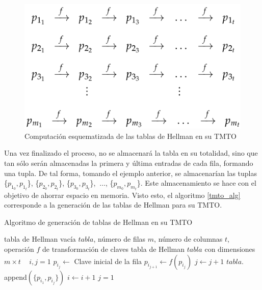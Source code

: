 \documentclass[12pt,spanish,listoffigures,listoftables,listofalgorithms]{tfgetsinf}
\begin{document}
\begin{figure}[H]
    \centering
    \includegraphics[scale = 0.3]{tabla_2.png}
    \caption{Computación esquematizada de las tablas de Hellman en su TMTO}
    \label{tabla}
\end{figure}

Una vez finalizado el proceso, no se almacenará la tabla en su totalidad, sino que tan sólo serán almacenadas la primera y última entradas de cada fila, formando una tupla. De tal forma, tomando el ejemplo anterior, se almacenarían las tuplas \{$p_{1_0}, p_{1_t}$\}, \{$p_{2_0}, p_{2_t}$\}, \{$p_{3_0}, p_{3_t}$\}, $~\dots$, \{$p_{m_0}, p_{m_t}$\}. Este almacenamiento se hace con el objetivo de ahorrar espacio en memoria. Visto esto, el algoritmo \ref{tmto_alg} corresponde a la generación de las tablas de Hellman para su TMTO.

\begin{algorithm}[H]
	\caption{Algoritmo de generación de tablas de Hellman en su TMTO}
	\label{tmto_alg}
	\begin{algorithmic}
		\REQUIRE tabla de Hellman vacía $tabla$, número de filas $m$, número de columnas $t$, operación $f$ de transformación de claves
		\ENSURE tabla de Hellman $tabla$ con dimensiones $m \times t$
		\STATE ~
		\STATE $i, j = 1$
			\STATE $p_{i_j} \leftarrow$ Clave inicial de la fila
				\STATE $p_{i_{j+1}} \leftarrow f(p_{i_j})$
				\STATE $j \leftarrow j + 1$
			\ENDWHILE
			\STATE $tabla.$append$(\{p_{i_1}, p_{i_j}\})$
			\STATE $i \leftarrow i + 1$
			\STATE $j = 1$
		\ENDWHILE
	\end{algorithmic}
\end{algorithm}
\end{document}
